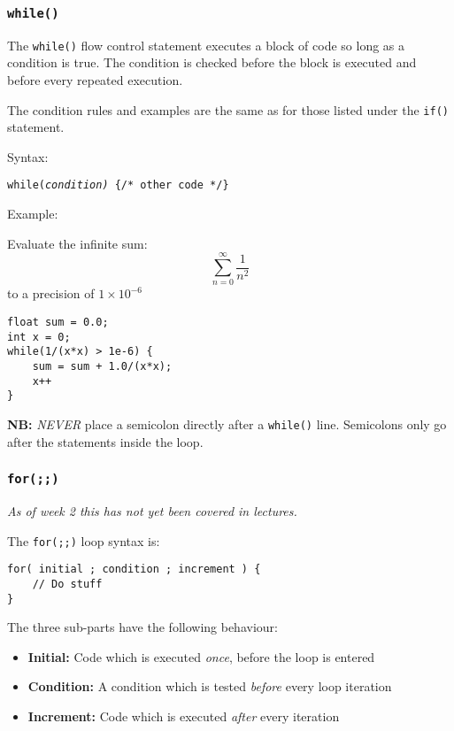 \documentclass{lab}
\begin{document}
\begin{multicols}{2}
\subsubsection{\texttt{while()}}

The \texttt{while()} flow control statement executes a block of code so long as a condition is true. The condition is checked before the block is executed and before every repeated execution.

The condition rules and examples are the same as for those listed under the \texttt{if()} statement.

Syntax:

\texttt{while(\textit{condition)} \{/* other code */\}}

Example:

Evaluate the infinite sum:
\begin{equation}
\sum_{n=0}^{\infty} \frac{1}{n^2}
\end{equation}
to a precision of $1 \times 10^{-6}$
\begin{lstlisting}[style=CStyle]
float sum = 0.0;
int x = 0;
while(1/(x*x) > 1e-6) {
	sum = sum + 1.0/(x*x);
	x++
}
\end{lstlisting}

\textbf{NB:} \textit{NEVER} place a semicolon directly after a \texttt{while()} line. Semicolons only go after the statements inside the loop.

\subsubsection{\texttt{for(;;)}}

\textit{As of week 2 this has not yet been covered in lectures.}

The \texttt{for(;;)} loop syntax is:

\begin{lstlisting}[style=CStyle]
for( initial ; condition ; increment ) {
	// Do stuff
}
\end{lstlisting}

The three sub-parts have the following behaviour:

\begin{itemize}
\item \textbf{Initial:} Code which is executed \textit{once}, before the loop is entered
\item \textbf{Condition:} A condition which is tested \textit{before} every loop iteration
\item \textbf{Increment:} Code which is executed \textit{after} every iteration
\end{itemize}


\end{multicols}
\end{document}

